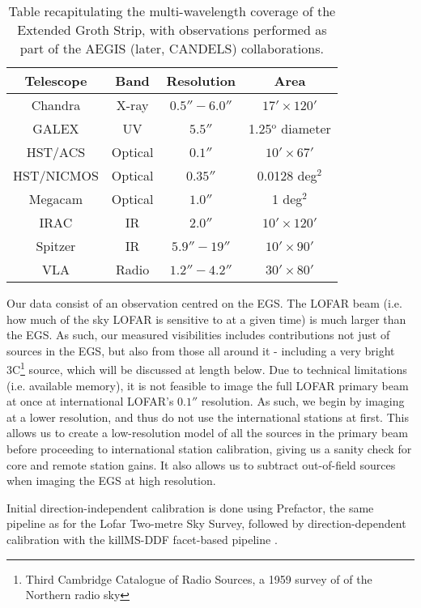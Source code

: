 \begin{table}[h!]
\begin{tabular}{cccc}
Telescope    & Band    & Resolution  & Area \\\hline
Chandra      & X-ray   & $0.5''-6.0''$ & $17'\times 120'$ \\
GALEX        & UV      & $5.5''      $ & 1.25$^\text{o}$ diameter \\
HST/ACS      & Optical & $0.1''      $ & $10' \times 67'$\\
HST/NICMOS   & Optical & $0.35''     $ & 0.0128 deg$^2$\\
Megacam      & Optical & $1.0''      $ & 1 deg$^2$\\
IRAC         & IR      & $2.0''      $ & $10' \times 120'$ \\
Spitzer      & IR      & $5.9''-19'' $ & $10'\times 90'$\\
VLA          & Radio   & $1.2''-4.2''$ & $30' \times 80'$
\end{tabular}
\caption{\label{table.EGS.observation}Table recapitulating the multi-wavelength coverage of the Extended Groth Strip, with observations performed as part of the AEGIS (later, CANDELS) collaborations.}
\end{table}


\pg
Our data consist of an observation centred on the EGS. The LOFAR beam (i.e. how much of the sky LOFAR is sensitive to at a given time) is much larger than the EGS. As such, our measured visibilities includes contributions not just of sources in the EGS, but also from those all around it - including a very bright 3C\footnote{Third Cambridge Catalogue of Radio Sources, a 1959 survey of of the Northern radio sky}  source, which will be discussed at length below. Due to technical limitations (i.e. available memory), it is not feasible to image the full LOFAR primary beam at once at international LOFAR's  $0.1''$ resolution. As such, we begin by imaging at a lower resolution, and thus do not use the international stations at first. This allows us to create a low-resolution model of all the sources in the primary beam before proceeding to international station calibration, giving us a sanity check for core and remote station gains. It also allows us to subtract out-of-field sources when imaging the EGS at high resolution.

\pg
Initial direction-independent calibration is done using Prefactor, the same pipeline as for the Lofar Two-metre Sky Survey, followed by direction-dependent calibration with the killMS-DDF facet-based pipeline . %

